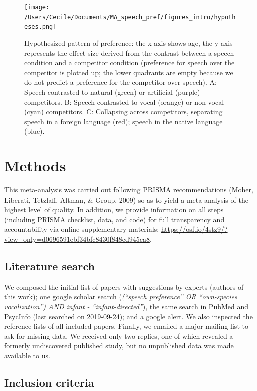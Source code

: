 \documentclass[man]{apa6}
\begin{document}
\begin{figure}
\centering
\texttt{[image: /Users/Cecile/Documents/MA\_speech\_pref/figures\_intro/hypotheses.png]}
\caption{\label{fig:hyp}Hypothesized pattern of preference: the x axis shows age, the y axis represents the effect size derived from the contrast between a speech condition and a competitor condition (preference for speech over the competitor is plotted up; the lower quadrants are empty because we do not predict a preference for the competitor over speech). A: Speech contrasted to natural (green) or artificial (purple) competitors. B: Speech contrasted to vocal (orange) or non-vocal (cyan) competitors. C: Collapsing across competitors, separating speech in a foreign language (red); speech in the native language (blue).}
\end{figure}

\hypertarget{methods}{%
\section{Methods}\label{methods}}

This meta-analysis was carried out following PRISMA recommendations (Moher, Liberati, Tetzlaff, Altman, \& Group, 2009) so as to yield a meta-analysis of the highest level of quality. In addition, we provide information on all steps (including PRISMA checklist, data, and code) for full transparency and accountability via online supplementary materials; \url{https://osf.io/4stz9/?view_only=d0696591ebf34bfc8430f848cd945ca8}.

\hypertarget{literature-search}{%
\subsection{Literature search}\label{literature-search}}

We composed the initial list of papers with suggestions by experts (authors of this work); one google scholar search (\emph{(\enquote{speech preference} OR \enquote{own-species vocalization}) AND infant - \enquote{infant-directed}}), the same search in PubMed and PsycInfo (last searched on 2019-09-24); and a google alert. We also inspected the reference lists of all included papers. Finally, we emailed a major mailing list to ask for missing data. We received only two replies, one of which revealed a formerly undiscovered published study, but no unpublished data was made available to us.

\hypertarget{inclusion-criteria}{%
\subsection{Inclusion criteria}\label{inclusion-criteria}}
\end{document}
